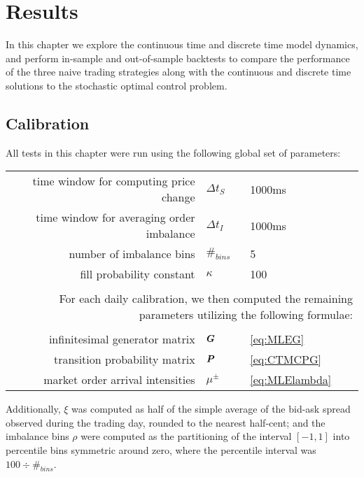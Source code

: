 \chapter{Results}

In this chapter we explore the continuous time and discrete time model dynamics, and perform in-sample and out-of-sample backtests to compare the performance of the three naive trading strategies along with the continuous and discrete time solutions to the stochastic optimal control problem.

\section{Calibration}

All tests in this chapter were run using the following global set of parameters:
\begin{center}
\begin{tabular}{rll}
time window for computing price change & $\Delta t_S$ & 1000ms \\
time window for averaging order imbalance & $\Delta t_I$ & 1000ms \\
number of imbalance bins & $\#_{bins}$ & 5 \\
fill probability constant & $\kappa$ & 100 \\
&& \\
\multicolumn{3}{p{\linewidth}}{For each daily calibration, we then computed the remaining parameters utilizing the following formulae:} \\
&& \\
infinitesimal generator matrix & $\boldsymbol{G}$ & \autoref{eq:MLEG} \\
transition probability matrix & $\boldsymbol{P}$ & \autoref{eq:CTMCPG} \\
market order arrival intensities & $\mu^\pm$ & \autoref{eq:MLElambda}
\end{tabular}
\end{center}

Additionally, $\xi$ was computed as half of the simple average of the bid-ask spread observed during the trading day, rounded to the nearest half-cent; and the imbalance bins $\rho$ were computed as the partitioning of the interval $[-1,1]$ into percentile bins symmetric around zero, where the percentile interval was $100 \div \#_{bins}$.

